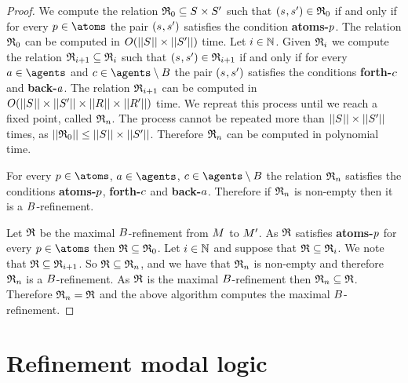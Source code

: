 \begin{proof}
We compute the relation $\refinement_0 \subseteq \kStates \times \kStatesP$ such that $(\kStateS, \kStateSP) \in \refinement_0$ if and only if for every $\atomP \in \atoms$ the pair $(\kStateS, \kStateSP)$ satisfies the condition {\bf atoms-$p$}.
The relation $\mathfrak{R}_0$ can be computed in $O(||\kStates|| \times ||\kStatesP||)$ time.
Let $i \in \mathbb{N}$.
Given $\mathfrak{R}_i$ we compute the relation $\mathfrak{R}_{i+1} \subseteq \mathfrak{R}_i$ such that $(\kStateS, \kStateSP) \in \refinement_{i+1}$ if and only if for every $\agentA \in \agents$ and $\agentC \in \agents \setminus \agentsB$ the pair $(\kStateS, \kStateSP)$ satisfies the conditions {\bf forth-$c$} and {\bf back-$a$}.
The relation $\mathfrak{R}_{i+1}$ can be computed in $O(||\kStates|| \times ||\kStatesP|| \times ||\kAccessibilityRel|| \times ||\kAccessibilityRelP||)$ time.
We repreat this process until we reach a fixed point, called $\mathfrak{R}_n$.
The process cannot be repeated more than $||\kStates|| \times ||\kStatesP||$ times, as $||\refinement_0|| \leq ||\kStates|| \times ||\kStatesP||$.
Therefore $\mathfrak{R}_n$ can be computed in polynomial time.

For every $\atomP \in \atoms$, $\agentA \in \agents$, $\agentC \in \agents \setminus \agentsB$ the relation $\mathfrak{R}_n$ satisfies the conditions {\bf atoms-$p$}, {\bf forth-$c$} and {\bf back-$a$}.
Therefore if $\mathfrak{R}_n$ is non-empty then it is a $B$-refinement.

Let $\mathfrak{R}$ be the maximal $B$-refinement from $\kModel$ to ${M^{\prime}_{}}$.
As $\mathfrak{R}$ satisfies {\bf atoms-$p$} for every $\atomP \in \atoms$ then $\mathfrak{R} \subseteq \mathfrak{R}_0$.
Let $i \in \mathbb{N}$ and suppose that $\mathfrak{R} \subseteq \mathfrak{R}_i$. 
We note that $\mathfrak{R} \subseteq \mathfrak{R}_{i + 1}$.
So $\mathfrak{R} \subseteq \mathfrak{R}_n$, and we have that $\mathfrak{R}_n$ is non-empty and therefore $\mathfrak{R}_n$ is a $B$-refinement.
As $\mathfrak{R}$ is the maximal $B$-refinement then $\mathfrak{R}_n \subseteq \mathfrak{R}$.
Therefore $\mathfrak{R}_n = \mathfrak{R}$ and the above algorithm computes the maximal $B$-refinement.
\end{proof}

\section{Refinement modal logic}

